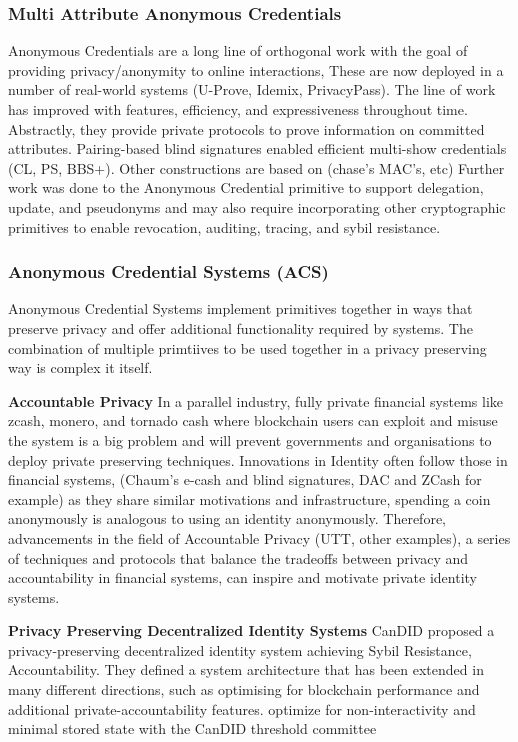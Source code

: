 \subsubsection{Multi Attribute Anonymous Credentials} 
Anonymous Credentials are a long line of orthogonal work with the goal of providing privacy/anonymity to online interactions, These are now deployed in a number of real-world systems (U-Prove, Idemix, PrivacyPass).  
The line of work has improved with features, efficiency, and expressiveness throughout time. 
Abstractly, they provide private protocols to prove information on committed attributes. 
Pairing-based blind signatures enabled efficient multi-show credentials (CL, PS, BBS+).
Other constructions are based on (chase's MAC's, etc) 
Further work was done to the Anonymous Credential primitive to support delegation, update, and pseudonyms and may also require incorporating other cryptographic primitives to enable revocation, auditing, tracing, and sybil resistance. 

\subsubsection{Anonymous Credential Systems (ACS)} 
Anonymous Credential Systems implement primitives together in ways that preserve privacy and offer additional functionality required by systems. The combination of multiple primtiives to be used together in a privacy preserving way is complex it itself. 

\noindent \textbf{Accountable Privacy}
In a parallel industry, fully private financial systems like zcash, monero, and tornado cash where blockchain users can exploit and misuse the system is a big problem and will prevent governments and organisations to deploy private preserving techniques. Innovations in Identity often follow those in financial systems, (Chaum's e-cash and blind signatures, DAC and ZCash for example) as they share similar motivations and infrastructure, spending a coin anonymously is analogous to using an identity anonymously. Therefore, advancements in the field of Accountable Privacy (UTT, other examples), a series of techniques and protocols that balance the tradeoffs between privacy and accountability in financial systems, can inspire and motivate private identity systems.

\noindent \textbf{Privacy Preserving Decentralized Identity Systems}
CanDID proposed a privacy-preserving decentralized identity system achieving Sybil Resistance, Accountability. 
They defined a system architecture that has been extended in many different directions, such as \cite{wang2023hades, rathee_zebra_2022} optimising for blockchain performance and additional private-accountability features. \cite{crites_syra_2024, rabaninejad_attribute-based_nodate} optimize for non-interactivity and minimal stored state with the CanDID threshold committee

